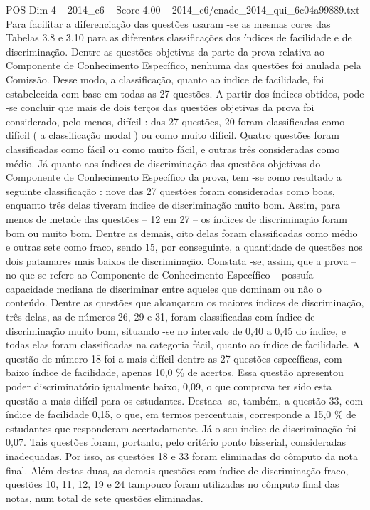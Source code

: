 \begin{textsample}{POS Dim 4 – 2014\_c6 – Score 4.00 – 2014\_c6/enade\_2014\_qui\_6c04a99889.txt}
Para facilitar a diferenciação das questões usaram -se as mesmas cores das Tabelas 3.8 e 3.10 para as diferentes classificações dos índices de facilidade e de discriminação.
Dentre as questões objetivas da parte da prova relativa ao Componente de Conhecimento Específico, nenhuma das questões foi anulada pela Comissão.
Desse modo, a classificação, quanto ao índice de facilidade, foi estabelecida com base em todas as 27 questões.
A partir dos índices obtidos, pode -se concluir que mais de dois terços das questões objetivas da prova foi considerado, pelo menos, difícil : das 27 questões, 20 foram classificadas como difícil ( a classificação modal ) ou como muito difícil.
Quatro questões foram classificadas como fácil ou como muito fácil, e outras três consideradas como médio.
Já quanto aos índices de discriminação das questões objetivas do Componente de Conhecimento Específico da prova, tem -se como resultado a seguinte classificação : nove das 27 questões foram consideradas como boas, enquanto três delas tiveram índice de discriminação muito bom.
Assim, para menos de metade das questões – 12 em 27 – os índices de discriminação foram bom ou muito bom.
Dentre as demais, oito delas foram classificadas como médio e outras sete como fraco, sendo 15, por conseguinte, a quantidade de questões nos dois patamares mais baixos de discriminação.
Constata -se, assim, que a prova – no que se refere ao Componente de Conhecimento Específico – possuía capacidade mediana de discriminar entre aqueles que dominam ou não o conteúdo.
Dentre as questões que alcançaram os maiores índices de discriminação, três delas, as de números 26, 29 e 31, foram classificadas com índice de discriminação muito bom, situando -se no intervalo de 0,40 a 0,45 do índice, e todas elas foram classificadas na categoria fácil, quanto ao índice de facilidade.
A questão de número 18 foi a mais difícil dentre as 27 questões específicas, com baixo índice de facilidade, apenas 10,0 \% de acertos.
Essa questão apresentou poder discriminatório igualmente baixo, 0,09, o que comprova ter sido esta questão a mais difícil para os estudantes.
Destaca -se, também, a questão 33, com índice de facilidade 0,15, o que, em termos percentuais, corresponde a 15,0 \% de estudantes que responderam acertadamente.
Já o seu índice de discriminação foi 0,07.
Tais questões foram, portanto, pelo critério ponto bisserial, consideradas inadequadas.
Por isso, as questões 18 e 33 foram eliminadas do cômputo da nota final.
Além destas duas, as demais questões com índice de discriminação fraco, questões 10, 11, 12, 19 e 24 tampouco foram utilizadas no cômputo final das notas, num total de sete questões eliminadas.

\end{textsample}
